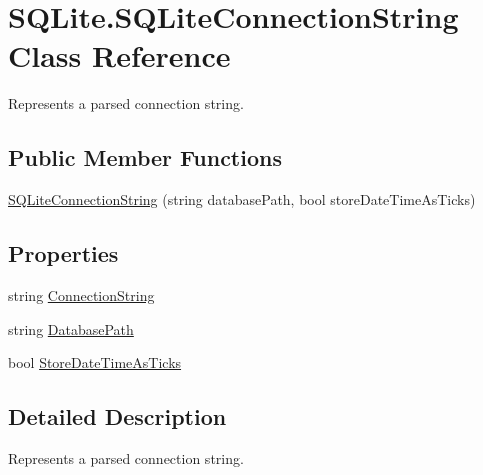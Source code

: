 \hypertarget{class_s_q_lite_1_1_s_q_lite_connection_string}{\section{S\+Q\+Lite.\+S\+Q\+Lite\+Connection\+String Class Reference}
\label{class_s_q_lite_1_1_s_q_lite_connection_string}
}


Represents a parsed connection string.  


\subsection*{Public Member Functions}
\begin{DoxyCompactItemize}
\item 
\hyperlink{class_s_q_lite_1_1_s_q_lite_connection_string_ae5ec4b3dabdbb7c581d0931382fb06ef}{S\+Q\+Lite\+Connection\+String} (string database\+Path, bool store\+Date\+Time\+As\+Ticks)
\end{DoxyCompactItemize}
\subsection*{Properties}
\begin{DoxyCompactItemize}
\item 
string \hyperlink{class_s_q_lite_1_1_s_q_lite_connection_string_aeafe2630ba2871c730f2ea6b7cbcc15a}{Connection\+String}
\item 
string \hyperlink{class_s_q_lite_1_1_s_q_lite_connection_string_aa5fb18dd049e2f5ca930f9023525734d}{Database\+Path}
\item 
bool \hyperlink{class_s_q_lite_1_1_s_q_lite_connection_string_a1736975db702ccd8375cc77949511ff3}{Store\+Date\+Time\+As\+Ticks}
\end{DoxyCompactItemize}


\subsection{Detailed Description}
Represents a parsed connection string. 




